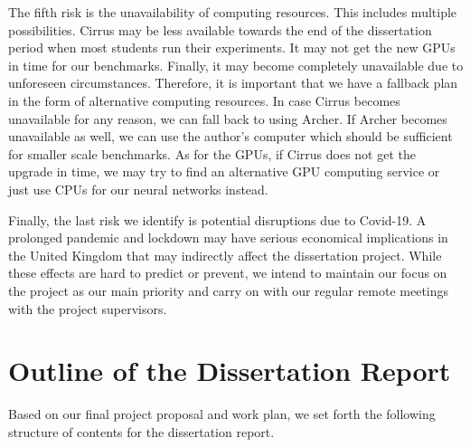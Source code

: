\documentclass{article}
\begin{document}
The fifth risk is the unavailability of computing resources. This includes multiple possibilities. Cirrus may be less available towards the end of the dissertation period when most students run their experiments. It may not get the new GPUs in time for our benchmarks. Finally, it may become completely unavailable due to unforeseen circumstances. Therefore, it is important that we have a fallback plan in the form of alternative computing resources. In case Cirrus becomes unavailable for any reason, we can fall back to using Archer. If Archer becomes unavailable as well, we can use the author's computer which should be sufficient for smaller scale benchmarks. As for the GPUs, if Cirrus does not get the upgrade in time, we may try to find an alternative GPU computing service or just use CPUs for our neural networks instead.

Finally, the last risk we identify is potential disruptions due to Covid-19. A prolonged pandemic and lockdown may have serious economical implications in the United Kingdom that may indirectly affect the dissertation project. While these effects are hard to predict or prevent, we intend to maintain our focus on the project as our main priority and carry on with our regular remote meetings with the project supervisors.

\section{Outline of the Dissertation Report}

Based on our final project proposal and work plan, we set forth the following structure of contents for the dissertation report.
\end{document}
